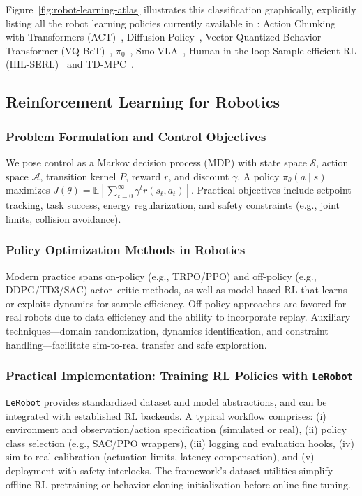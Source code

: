 Figure~\ref{fig:robot-learning-atlas} illustrates this classification graphically, explicitly listing all the robot learning policies currently available in \lerobot: Action Chunking with Transformers (ACT)~\citep{zhaoLearningFineGrainedBimanual2023}, Diffusion Policy~\citep{chiDiffusionPolicyVisuomotor2024}, Vector-Quantized Behavior Transformer (VQ-BeT)~\citep{leeBehaviorGenerationLatent2024}, \( \pi_0 \)~\citep{blackpi0VisionLanguageActionFlow2024}, SmolVLA~\citep{shukorSmolVLAVisionLanguageActionModel2025}, Human-in-the-loop Sample-efficient RL (HIL-SERL)~\citep{luoPreciseDexterousRobotic2024} and TD-MPC~\citep{hansenTemporalDifferenceLearning2022}.

\subsection{Reinforcement Learning for Robotics}

\subsubsection{Problem Formulation and Control Objectives}
We pose control as a Markov decision process (MDP) with state space \(\mathcal{S}\), action space \(\mathcal{A}\), transition kernel \(P\), reward \(r\), and discount \(\gamma\). A policy \(\pi_\theta(a\!\mid\!s)\) maximizes \(J(\theta)=\mathbb{E}\!\left[\sum_{t=0}^{\infty}\gamma^t r(s_t,a_t)\right]\). Practical objectives include setpoint tracking, task success, energy regularization, and safety constraints (e.g., joint limits, collision avoidance).

\subsubsection{Policy Optimization Methods in Robotics}
Modern practice spans on-policy (e.g., TRPO/PPO) and off-policy (e.g., DDPG/TD3/SAC) actor–critic methods, as well as model-based RL that learns or exploits dynamics for sample efficiency. Off-policy approaches are favored for real robots due to data efficiency and the ability to incorporate replay. Auxiliary techniques—domain randomization, dynamics identification, and constraint handling—facilitate sim-to-real transfer and safe exploration.

\subsubsection{Practical Implementation: Training RL Policies with \texttt{LeRobot}}
\texttt{LeRobot} provides standardized dataset and model abstractions, and can be integrated with established RL backends. A typical workflow comprises: (i) environment and observation/action specification (simulated or real), (ii) policy class selection (e.g., SAC/PPO wrappers), (iii) logging and evaluation hooks, (iv) sim-to-real calibration (actuation limits, latency compensation), and (v) deployment with safety interlocks. The framework’s dataset utilities simplify offline RL pretraining or behavior cloning initialization before online fine-tuning.


